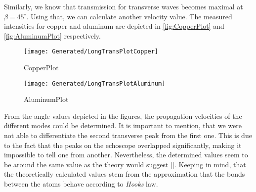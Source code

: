\documentclass[a4paper,10pt,twocolumn]{article}
\begin{document}
    Similarly, we know that transmission for transverse waves becomes maximal at $\beta = 45^\circ $.
    Using that, we can calculate another velocity value.
    The measured intensities for copper and aluminum are depicted in \autoref{fig:CopperPlot} and \autoref{fig:AluminumPlot} respectively.
    \begin{figure}
        \begin{center}
            \texttt{[image: Generated/LongTransPlotCopper]}
            \caption[]{CopperPlot}
            \label{fig:CopperPlot}
        \end{center}
    \end{figure}
    \begin{figure}
        \begin{center}
            \texttt{[image: Generated/LongTransPlotAluminum]}
            \caption[]{AluminumPlot}
            \label{fig:AluminumPlot}
        \end{center}
    \end{figure}
    From the angle values depicted in the figures, the propagation velocities of the different modes could be determined.
    It is important to mention, that we were not able to differentiate the second transverse peak from the first one.
    This is due to the fact that the peaks on the echoscope overlapped significantly, making it impossible to tell one from another.
    Nevertheless, the determined values seem to be around the same value as the theory would suggest \autoref{}.
    Keeping in mind, that the theoretically calculated values stem from the approximation that the bonds between the atoms behave according to \textit{Hooks} law.
    
\end{document}
